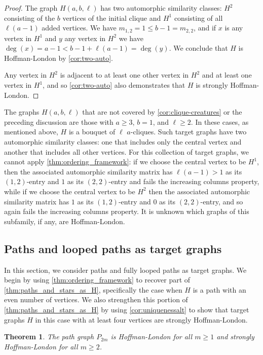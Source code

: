 \documentclass[11pt]{article}
\newtheorem{theorem}{Theorem}[section]
\theoremstyle{definition}
\begin{document}
\begin{proof}
The graph $H(a,b,\ell)$ has two automorphic similarity classes: $H^2$ consisting of the $b$ vertices of the initial clique and $H^1$ consisting of all $\ell(a-1)$ added vertices. We have $m_{1,2} = 1 \le b-1 = m_{2,2}$, and if $x$ is any vertex in $H^1$ and $y$ any vertex in $H^2$ we have $\deg(x) = a-1 < b-1 + \ell(a-1) = \deg(y)$. We conclude that $H$ is Hoffman-London by \cref{cor:two-auto}. 

Any vertex in $H^2$ is adjacent to at least one other vertex in $H^2$ and at least one vertex in $H^1$, and so \cref{cor:two-auto} also demonstrates that $H$ is strongly Hoffman-London.
\end{proof}

The graphs $H(a,b,\ell)$ that are not covered by \cref{cor:clique-creatures} or the preceding discussion are those with $a \ge 3$, $b=1$, and $\ell \ge 2$. In these cases, as mentioned above, $H$ is a bouquet of $\ell$ $a$-cliques. Such target graphs have two automorphic similarity classes: one that includes only the central vertex and another that includes all other vertices. For this collection of target graphs, we cannot apply \cref{thm:ordering_framework}: if we choose the central vertex to be $H^1$, then the associated automorphic similarity matrix has $\ell(a-1) > 1$ as its $(1,2)$-entry and $1$ as its $(2,2)$-entry and fails the increasing columns property, while if we choose the central vertex to be $H^2$ then the associated automorphic similarity matrix has $1$ as its $(1,2)$-entry and $0$ as its $(2,2)$-entry, and so again fails the increasing columns property. It is unknown which graphs of this subfamily, if any, are Hoffman-London.

\subsection{Paths and looped paths as target graphs} \label{ssec:paths}

In this section, we consider paths and fully looped paths as target graphs. We begin by using \cref{thm:ordering_framework} to recover part of \cref{thm:paths_and_stars_as_H}, specifically the case when $H$ is a path with an even number of vertices. We also strengthen this portion of \cref{thm:paths_and_stars_as_H} by using \cref{cor:uniquenessalt} to show that target graphs $H$ in this case with at least four vertices are strongly Hoffman-London.

\begin{theorem} \label{thm:even_path_minimizer}
The path graph $P_{2m}$ is Hoffman-London for all $m \ge 1$ and strongly Hoffman-London for all $m \ge 2$.
\end{theorem}
\end{document}
